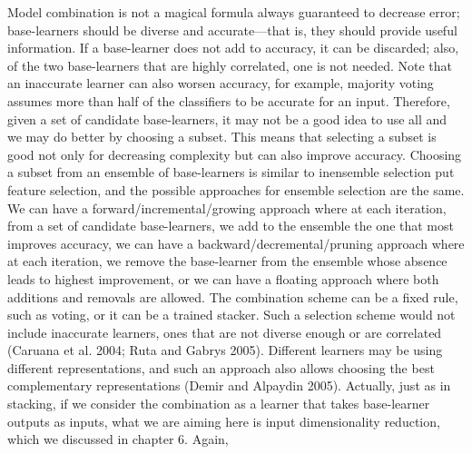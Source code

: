 Model combination is not a magical formula always guaranteed to decrease error; base-learners should be diverse and accurate---that is, they should provide useful information. If a base-learner does not add to accuracy, it can be discarded; also, of the two base-learners that are highly correlated, one is not needed. Note that an inaccurate learner can also worsen accuracy, for example, majority voting assumes more than half of the classifiers to be accurate for an input. Therefore, given a set of candidate base-learners, it may not be a good idea to use all and we may do better by choosing a subset. This means that selecting a subset is good not only for decreasing complexity but can also improve accuracy. Choosing a subset from an ensemble of base-learners is similar to inensemble selection put feature selection, and the possible approaches for ensemble selection are the same. We can have a forward/incremental/growing approach where at each iteration, from a set of candidate base-learners, we add to the ensemble the one that most improves accuracy, we can have a backward/decremental/pruning approach where at each iteration, we remove the base-learner from the ensemble whose absence leads to highest improvement, or we can have a floating approach where both additions and removals are allowed. The combination scheme can be a fixed rule, such as voting, or it can be a trained stacker. Such a selection scheme would not include inaccurate learners, ones that are not diverse enough or are correlated (Caruana et al. 2004; Ruta and Gabrys 2005). Different learners may be using different representations, and such an approach also allows choosing the best complementary representations (Demir and Alpaydin 2005). Actually, just as in stacking, if we consider the combination as a learner that takes base-learner outputs as inputs, what we are aiming here is input dimensionality reduction, which we discussed in chapter 6. Again,

